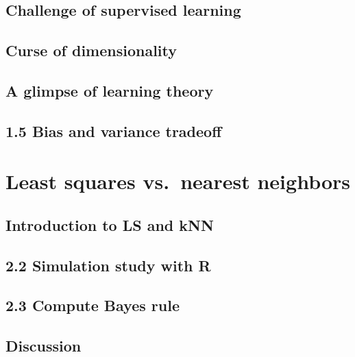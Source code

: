 \documentclass[
]{book}
\begin{document}
\hypertarget{challenge-of-supervised-learning}{%
\subsection{Challenge of supervised learning}\label{challenge-of-supervised-learning}}

\hypertarget{curse-of-dimensionality}{%
\subsection{Curse of dimensionality}\label{curse-of-dimensionality}}

\hypertarget{a-glimpse-of-learning-theory}{%
\subsection{A glimpse of learning theory}\label{a-glimpse-of-learning-theory}}

\hypertarget{bias-and-variance-tradeoff}{%
\subsection{1.5 Bias and variance tradeoff}\label{bias-and-variance-tradeoff}}

\hypertarget{least-squares-vs.-nearest-neighbors}{%
\section{Least squares vs.~nearest neighbors}\label{least-squares-vs.-nearest-neighbors}}

\hypertarget{introduction-to-ls-and-knn}{%
\subsection{Introduction to LS and kNN}\label{introduction-to-ls-and-knn}}

\hypertarget{simulation-study-with-r}{%
\subsection{2.2 Simulation study with R}\label{simulation-study-with-r}}

\hypertarget{compute-bayes-rule}{%
\subsection{2.3 Compute Bayes rule}\label{compute-bayes-rule}}

\hypertarget{discussion}{%
\subsection{Discussion}\label{discussion}}
\end{document}

